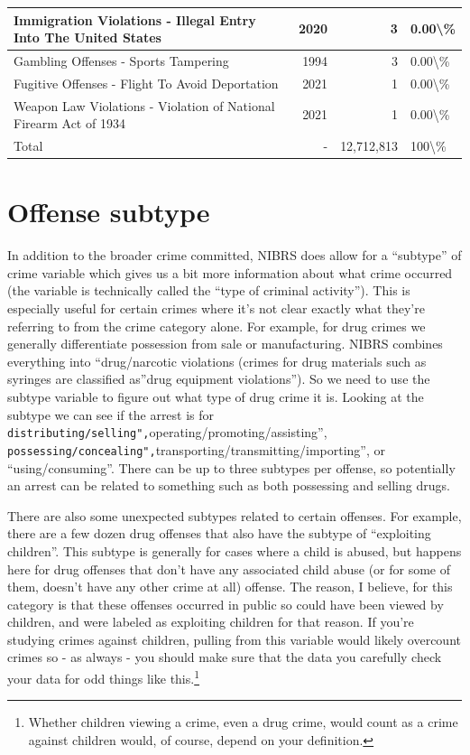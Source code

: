 \documentclass[
]{krantz}
\begin{document}
\begin{longtable}[t]{l|r|r|l}
\hline
Immigration Violations - Illegal Entry Into The United States & 2020 & 3 & 0.00\textbackslash{}\%\\
\hline
Gambling Offenses - Sports Tampering & 1994 & 3 & 0.00\textbackslash{}\%\\
\hline
Fugitive Offenses - Flight To Avoid Deportation & 2021 & 1 & 0.00\textbackslash{}\%\\
\hline
Weapon Law Violations - Violation of National Firearm Act of 1934 & 2021 & 1 & 0.00\textbackslash{}\%\\
\hline
Total & - & 12,712,813 & 100\textbackslash{}\%\\
\hline
\end{longtable}

\section{Offense subtype}\label{offense-subtype}

In addition to the broader crime committed, NIBRS does allow
for a ``subtype'' of crime variable which gives us a bit
more information about what crime occurred (the variable is
technically called the ``type of criminal activity''). This
is especially useful for certain crimes where it's not clear
exactly what they're referring to from the crime category
alone. For example, for drug crimes we generally
differentiate possession from sale or manufacturing. NIBRS
combines everything into ``drug/narcotic violations (crimes
for drug materials such as syringes are classified as''drug
equipment violations''). So we need to use the subtype
variable to figure out what type of drug crime it is.
Looking at the subtype we can see if the arrest is for
\texttt{distributing/selling",}operating/promoting/assisting'',
\texttt{possessing/concealing",}transporting/transmitting/importing'',
or ``using/consuming''. There can be up to three subtypes
per offense, so potentially an arrest can be related to
something such as both possessing and selling drugs.

There are also some unexpected subtypes related to certain
offenses. For example, there are a few dozen drug offenses
that also have the subtype of ``exploiting children''. This
subtype is generally for cases where a child is abused, but
happens here for drug offenses that don't have any
associated child abuse (or for some of them, doesn't have
any other crime at all) offense. The reason, I believe, for
this category is that these offenses occurred in public so
could have been viewed by children, and were labeled as
exploiting children for that reason. If you're studying
crimes against children, pulling from this variable would
likely overcount crimes so - as always - you should make
sure that the data you carefully check your data for odd
things like this.\footnote{Whether children viewing a crime,
  even a drug crime, would count as a crime against children
  would, of course, depend on your definition.}
\end{document}
